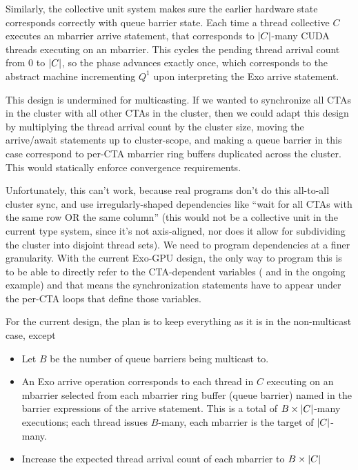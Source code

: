 \filbreak
Similarly, the collective unit system makes sure the earlier hardware state corresponds correctly with queue barrier state.
Each time a thread collective $C$ executes an mbarrier arrive statement, that corresponds to $\left \vert C \right\vert$-many CUDA threads executing  on an mbarrier.
This cycles the pending thread arrival count from 0 to $\left \vert C \right\vert$, so the phase advances exactly once, which corresponds to the abstract machine incrementing $Q^1$ upon interpreting the Exo arrive statement.

\filbreak
This design is undermined for multicasting.
If we wanted to synchronize all CTAs in the cluster with all other CTAs in the cluster, then we could adapt this design by multiplying the thread arrival count by the cluster size, moving the arrive/await statements up to cluster-scope, and making a queue barrier in this case correspond to per-CTA mbarrier ring buffers duplicated across the cluster.
This would statically enforce convergence requirements.

\filbreak
Unfortunately, this can't work, because real programs don't do this all-to-all cluster sync, and use irregularly-shaped dependencies like ``wait for all CTAs with the same row OR the same column'' (this would not be a collective unit in the current type system, since it's not axis-aligned, nor does it allow for subdividing the cluster into disjoint thread sets).
We need to program dependencies at a finer granularity.
With the current Exo-GPU design, the only way to program this is to be able to directly refer to the CTA-dependent variables ( and  in the ongoing example) and that means the synchronization statements have to appear under the per-CTA loops that define those variables.

\filbreak
For the current design, the plan is to keep everything as it is in the non-multicast case, except
\begin{itemize}
  \item Let $B$ be the number of queue barriers being multicast to.
  \filbreak
  \item An Exo arrive operation corresponds to each thread in $C$ executing  on an mbarrier selected from each mbarrier ring buffer (queue barrier) named in the barrier expressions of the arrive statement.
  This is a total of $B\times\left \vert C \right\vert$-many  executions; each thread issues $B$-many, each mbarrier is the target of $\left \vert C \right\vert$-many.
  \filbreak
  \item Increase the expected thread arrival count of each mbarrier to $B\times\left \vert C \right\vert$
\end{itemize}

